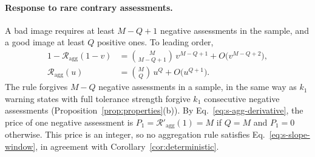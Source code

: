 \documentclass[10pt]{wlscirep}
\newcommand{\Rmap}{\mathscr{R}}            %
\newcommand{\Pone}{P_{1}}                  %
\theoremstyle{plain}
\theoremstyle{remark}
\begin{document}
\paragraph{Response to rare contrary assessments.} A bad image requires at least $M-Q+1$ negative assessments in the sample, and a good image at least $Q$ positive ones. To leading order,
\begin{equation}
\begin{aligned}
1-\Rmap_{\mathrm{agg}}(1-v)&=\binom{M}{M-Q+1}\,v^{M-Q+1}+O\bigl(v^{M-Q+2}\bigr),\\
\Rmap_{\mathrm{agg}}(u)&=\binom{M}{Q}\,u^{Q}+O\bigl(u^{Q+1}\bigr).
\end{aligned}
\label{eq:s-agg-limits}
\end{equation}
The rule forgives $M-Q$ negative assessments in a sample, in the same way as $k_1$ warning states with full tolerance strength forgive $k_1$ consecutive negative assessments (Proposition~\ref{prop:properties}(b)). By Eq.~\eqref{eq:s-agg-derivative}, the price of one negative assessment is $\Pone=\Rmap'_{\mathrm{agg}}(1)=M$ if $Q=M$ and $\Pone=0$ otherwise. This price is an integer, so no aggregation rule satisfies Eq.~\eqref{eq:s-slope-window}, in agreement with Corollary~\ref{cor:deterministic}.
\end{document}
